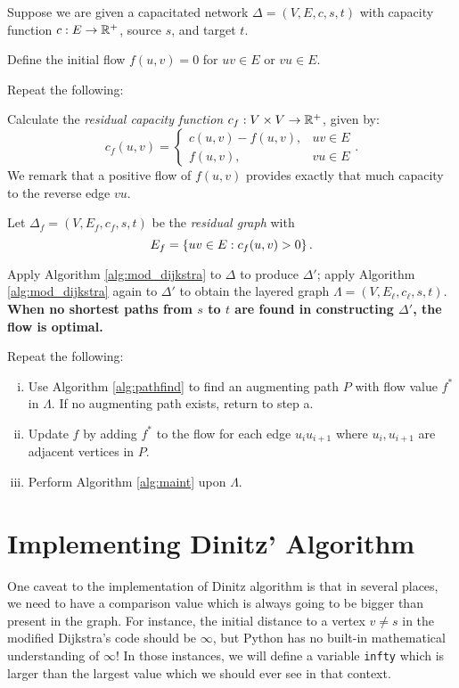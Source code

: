 \documentclass[m3380-lec-main.tex]{subfiles}
\begin{document}
\begin{alg}
Suppose we are given a capacitated network $\Delta = (V,E,c,s,t)$ with capacity function $c:E\to\mathbb{R}^+$, source $s$, and target $t$.
\begin{enum}
\item Define the initial flow $f(u,v)=0$ for $uv\in E$ or $vu\in E$.
\item Repeat the following:
\begin{enuma}
\item Calculate the \emph{residual capacity function} $c_f:V\times V\to \mathbb{R}^+$, given by:
\[c_f(u,v) = \begin{cases}
    c(u,v) - f(u,v), & uv\in E \\
    f(u,v), & vu\in E
    \end{cases}. \]
We remark that a positive flow of $f(u,v)$ provides exactly that much capacity to the reverse edge $vu$.
\item Let $\Delta_f=(V,E_f,c_f,s,t)$ be the \emph{residual graph} with \[E_f=\left\{uv\in E:c_f(u,v)>0\right\}.\]
\item Apply Algorithm \ref{alg:mod_dijkstra} to $\Delta$ to produce $\Delta'$; apply Algorithm \ref{alg:mod_dijkstra} again to $\Delta'$ to obtain the layered graph $\Lambda = (V,E_\ell,c_\ell,s,t)$. \textbf{When no shortest paths from $s$ to $t$ are found in constructing $\Delta'$, the flow is optimal.}
\item Repeat the following:
\begin{enumerate}[i.~]
\item Use Algorithm \ref{alg:pathfind} to find an augmenting path $P$ with flow value $f^*$ in $\Lambda$. If no augmenting path exists, return to step a.
\item Update $f$ by adding $f^*$ to the flow for each edge $u_iu_{i+1}$ where $u_i,u_{i+1}$ are adjacent vertices in $P$.
\item Perform Algorithm \ref{alg:maint} upon $\Lambda$.
\end{enumerate}
\end{enuma}
\end{enum}
\end{alg}

\section{Implementing Dinitz' Algorithm}
One caveat to the implementation of Dinitz algorithm is that in several places, we need to have a comparison value which is always going to be bigger than present in the graph. For instance, the initial distance to a vertex $v\neq s$ in the modified Dijkstra's code should be $\infty$, but Python has no built-in mathematical understanding of $\infty$! In those instances, we will define a variable \verb|infty| which is larger than the largest value which we should ever see in that context.
\end{document}
